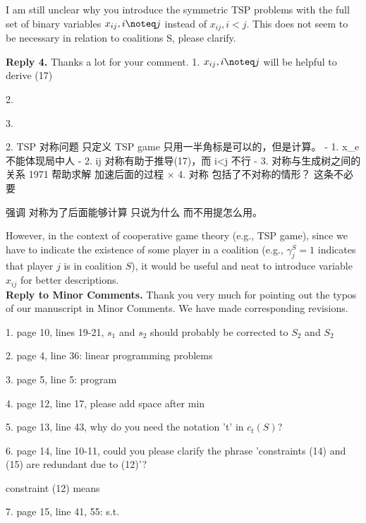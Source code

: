 \documentclass[11pt]{article}
\begin{document}
I am still unclear why you introduce the symmetric TSP problems with the full set of binary variables $x_{ij}, i \noteq j$ instead of $x_{ij}, i < j$. This does not seem to be necessary in relation to coalitions S, please clarify.

\noindent \textbf{Reply 4.}
Thanks a lot for your comment.
1.  $x_{ij}, i \noteq j$ will be helpful to derive (17)

2.

3. 

2. TSP 对称问题   只定义 TSP game 只用一半角标是可以的，但是计算。
- 1. x_e 不能体现局中人
- 2. ij 对称有助于推导(17)，而 i<j 不行
- 3. 对称与生成树之间的关系 1971 帮助求解  加速后面的过程
× 4. 对称 包括了不对称的情形？ 这条不必要

强调 对称为了后面能够计算  只说为什么 而不用提怎么用。

However, in the context of cooperative game theory (e.g., TSP game), since we have to indicate the existence of some player in a coalition (e.g., $\gamma^{S}_j=1$ indicates that player $j$ is in coalition $S$), it would be useful and neat to introduce variable $x_{ij}$ for better descriptions.
\\[4mm]


\noindent \textbf{Reply to Minor Comments.}
Thank you very much for pointing out the typos of our manuscript in Minor Comments. We have made corresponding revisions.

1. page 10, lines 19-21, $s_1$ and $s_2$ should probably be corrected to $S_2$ and $S_2$

2. page 4, line 36: linear programming problems

3. page 5, line 5: program

4. page 12, line 17, please add space after min

5. page 13, line 43, why do you need the notation 't' in $c_t(S)$?

6. page 14, line 10-11, could you please clarify the phrase 'constraints (14) and (15) are redundant due to (12)'?

constraint (12) means 

7. page 15, line 41, 55: s.t.

%
%

%
%
%


\end{document}
